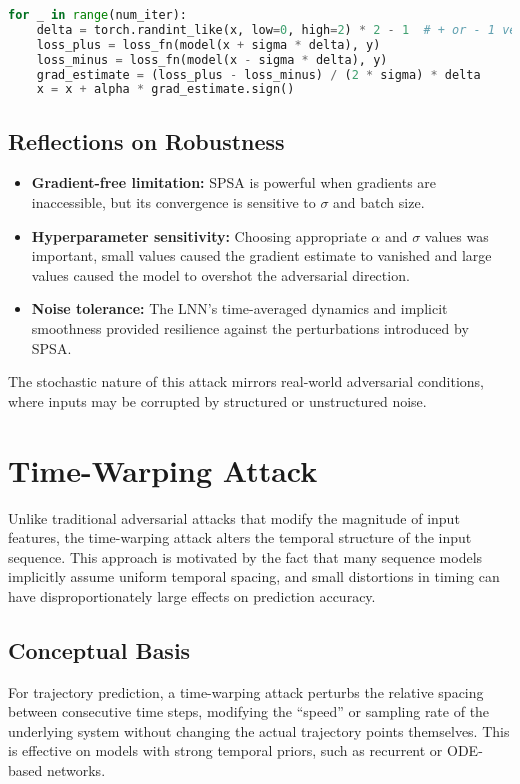 \begin{lstlisting}[language=Python, caption={Simplified SPSA implementation}]
for _ in range(num_iter):
    delta = torch.randint_like(x, low=0, high=2) * 2 - 1  # + or - 1 vector
    loss_plus = loss_fn(model(x + sigma * delta), y)
    loss_minus = loss_fn(model(x - sigma * delta), y)
    grad_estimate = (loss_plus - loss_minus) / (2 * sigma) * delta
    x = x + alpha * grad_estimate.sign()
\end{lstlisting}

\subsection*{Reflections on Robustness}
\begin{itemize}
    \item \textbf{Gradient-free limitation:} SPSA is powerful when gradients are inaccessible, but its convergence is sensitive to $\sigma$ and batch size.
    \item \textbf{Hyperparameter sensitivity:} Choosing appropriate $\alpha$ and $\sigma$ values was important, small values caused the gradient estimate to vanished and large values caused the model to overshot the adversarial direction.
    \item \textbf{Noise tolerance:} The LNN's time-averaged dynamics and implicit smoothness provided resilience against the perturbations introduced by SPSA.
\end{itemize}

The stochastic nature of this attack mirrors real-world adversarial conditions, where inputs may be corrupted by structured or unstructured noise.

\section{Time-Warping Attack}

Unlike traditional adversarial attacks that modify the magnitude of input features, the time-warping attack alters the temporal structure of the input sequence. This approach is motivated by the fact that many sequence models implicitly assume uniform temporal spacing, and small distortions in timing can have disproportionately large effects on prediction accuracy.

\subsection*{Conceptual Basis}
For trajectory prediction, a time-warping attack perturbs the relative spacing between consecutive time steps, modifying the “speed” or sampling rate of the underlying system without changing the actual trajectory points themselves. This is effective on models with strong temporal priors, such as recurrent or ODE-based networks.

